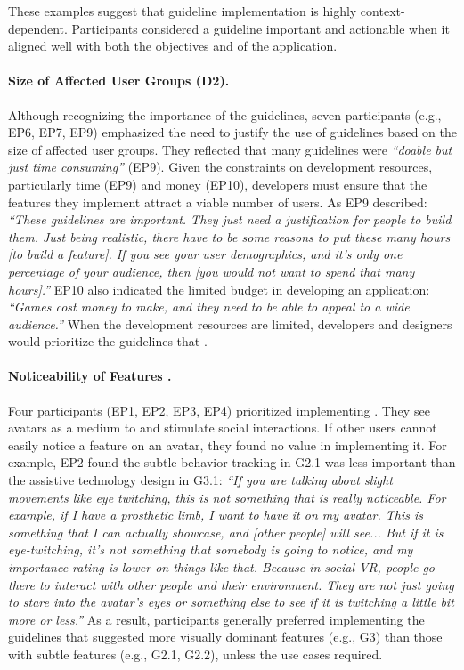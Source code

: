 These examples suggest that guideline implementation is highly context-dependent. Participants considered a guideline important and actionable when it aligned well with both the objectives and  of the application.

\paragraph{\textbf{Size of Affected User Groups (D2).}}
Although recognizing the importance of the guidelines, seven participants (e.g., EP6, EP7, EP9) emphasized the need to justify the use of guidelines based on the size of affected user groups. They reflected that many guidelines were \textit{``doable but just time consuming''} (EP9). Given the constraints on development resources, particularly time (EP9) and money (EP10), developers must ensure that the features they implement attract a viable number of users. As EP9 described: \textit{``These guidelines are important. They just need a justification for people to build them. Just being realistic, there have to be some reasons to put these many hours [to build a feature]. If you see your user demographics, and it's only one percentage of your audience, then [you would not want to spend that many hours].''} EP10 also indicated the limited budget in developing an application: \textit{``Games cost money to make, and they need to be able to appeal to a wide audience.''} When the development resources are limited, developers and designers would prioritize the guidelines that . 

\paragraph{\textbf{Noticeability of Features .}}
Four participants (EP1, EP2, EP3, EP4) prioritized implementing . They see avatars as a medium to  and stimulate social interactions. If other users cannot easily notice a feature on an avatar, they found no value in implementing it. For example, EP2 found the subtle behavior tracking in G2.1 was less important than the assistive technology design in G3.1: \textit{``If you are talking about slight movements like eye twitching, this is not something that is really noticeable. For example, if I have a prosthetic limb, I want to have it on my avatar. This is something that I can actually showcase, and [other people] will see... But if it is eye-twitching, it's not something that somebody is going to notice, and my importance rating is lower on things like that. Because in social VR, people go there to interact with other people and their environment. They are not just going to stare into the avatar's eyes or something else to see if it is twitching a little bit more or less.''}
As a result, participants generally preferred implementing the guidelines that suggested more visually dominant features (e.g., G3) than those with subtle features (e.g., G2.1, G2.2), unless the use cases required. 

